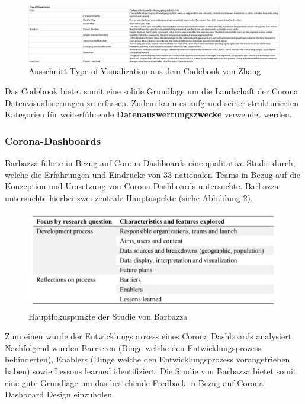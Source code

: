  
\begin{figure}[ht]
    \includegraphics[width=12cm]{images/zhang_codebook_type_of_visualization.png}
    \centering
    \caption{Ausschnitt Type of Visualization aus dem Codebook von Zhang ~\citep{zhang_codebook}}
    \label{fig:zhang_codebook_type_of_visualization}
\end{figure}

Das Codebook bietet somit eine solide Grundlage um die Landschaft der Corona Datenvisualisierungen zu erfassen. Zudem kann es aufgrund seiner strukturierten Kategorien für weiterführende \textbf{Datenauswertungszwecke} verwendet werden.   
 
 
\subsubsection{Corona-Dashboards} \label{ch:introduction_corona_dashboards}
Barbazza führte in Bezug auf Corona Dashboards eine qualitative Studie durch, welche die Erfahrungen und Eindrücke von 33 nationalen Teams in Bezug auf die Konzeption und Umsetzung von Corona Dashboards untersuchte. Barbazza untersuchte hierbei zwei zentrale Hauptaspekte (siehe Abbildung \ref{fig:barbazza_method_design}). 


\begin{figure}[ht]
    \includegraphics[width=12cm]{images/barbazza_method_design.png}
    \centering
    \caption{Hauptfokuspunkte der Studie von Barbazza ~\citep[S. 4]{barbazza}}
    \label{fig:barbazza_method_design}
\end{figure}

Zum einen wurde der Entwicklungsprozess eines Corona Dashboards analysiert. Nachfolgend wurden Barrieren (Dinge welche den Entwicklungsprozess behinderten), Enablers (Dinge welche den Entwicklungsprozess vorangetrieben haben) sowie Lessons learned identifiziert. Die Studie von Barbazza bietet somit eine gute Grundlage um das bestehende Feedback in Bezug auf Corona Dashboard Design einzuholen.

